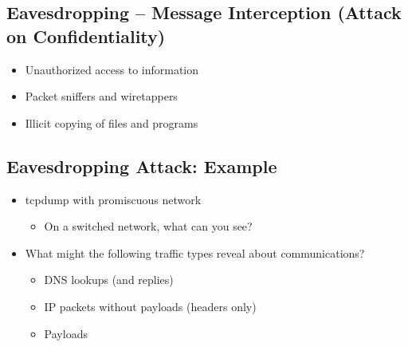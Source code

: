 \subsection{Eavesdropping -- Message Interception (Attack on Confidentiality)}
\begin{itemize}[nosep]
    \item Unauthorized access to information
    \item Packet sniffers and wiretappers
    \item Illicit copying of files and programs
\end{itemize}
\begin{figure}[H]
\end{figure}

\subsection{Eavesdropping Attack: Example}
\begin{itemize}[nosep]
    \item tcpdump with promiscuous network
          \begin{itemize}[nosep]
              \item On a switched network, what can you see?
          \end{itemize}
    \item What might the following traffic types reveal about communications?
          \begin{itemize}[nosep]
              \item DNS lookups (and replies)
              \item IP packets without payloads (headers only)
              \item Payloads
          \end{itemize}
\end{itemize}

